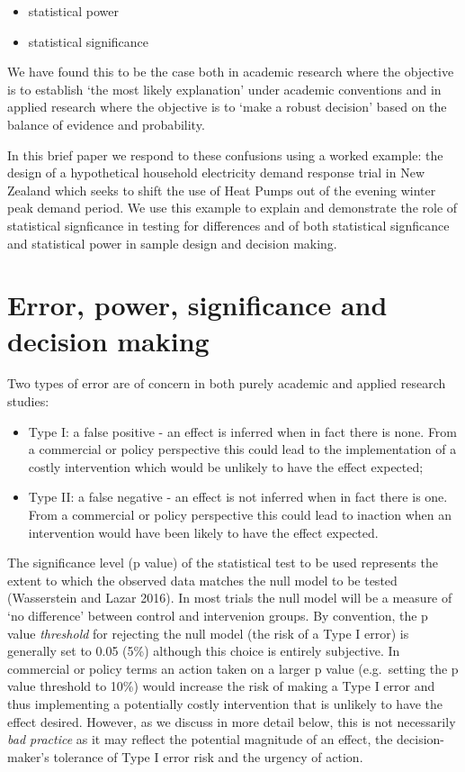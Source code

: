 \documentclass[]{article}
\providecommand{\tightlist}{%
  \setlength{\itemsep}{0pt}\setlength{\parskip}{0pt}}
\theoremstyle{definition}
\theoremstyle{definition}
\theoremstyle{definition}
\theoremstyle{remark}
\begin{document}
\begin{itemize}
\tightlist
\item
  statistical power
\item
  statistical significance
\end{itemize}

We have found this to be the case both in academic research where the
objective is to establish `the most likely explanation' under academic
conventions and in applied research where the objective is to `make a
robust decision' based on the balance of evidence and probability.

In this brief paper we respond to these confusions using a worked
example: the design of a hypothetical household electricity demand
response trial in New Zealand which seeks to shift the use of Heat Pumps
out of the evening winter peak demand period. We use this example to
explain and demonstrate the role of statistical signficance in testing
for differences and of both statistical signficance and statistical
power in sample design and decision making.

\section{Error, power, significance and decision
making}\label{error-power-significance-and-decision-making}

Two types of error are of concern in both purely academic and applied
research studies:

\begin{itemize}
\tightlist
\item
  Type I: a false positive - an effect is inferred when in fact there is
  none. From a commercial or policy perspective this could lead to the
  implementation of a costly intervention which would be unlikely to
  have the effect expected;
\item
  Type II: a false negative - an effect is not inferred when in fact
  there is one. From a commercial or policy perspective this could lead
  to inaction when an intervention would have been likely to have the
  effect expected.
\end{itemize}

The significance level (p value) of the statistical test to be used
represents the extent to which the observed data matches the null model
to be tested (Wasserstein and Lazar 2016). In most trials the null model
will be a measure of `no difference' between control and intervenion
groups. By convention, the p value \emph{threshold} for rejecting the
null model (the risk of a Type I error) is generally set to 0.05 (5\%)
although this choice is entirely subjective. In commercial or policy
terms an action taken on a larger p value (e.g.~setting the p value
threshold to 10\%) would increase the risk of making a Type I error and
thus implementing a potentially costly intervention that is unlikely to
have the effect desired. However, as we discuss in more detail below,
this is not necessarily \emph{bad practice} as it may reflect the
potential magnitude of an effect, the decision-maker's tolerance of Type
I error risk and the urgency of action.
\end{document}
